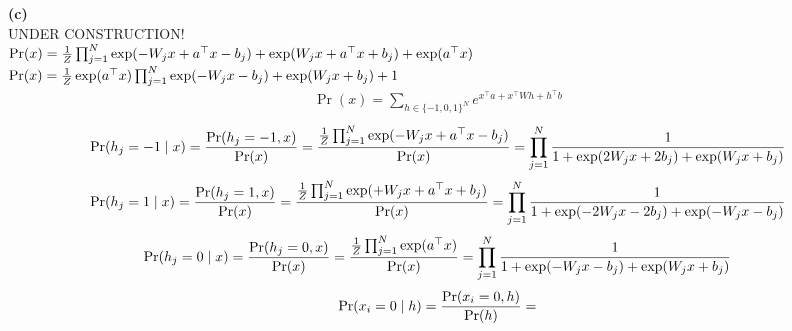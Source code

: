 \documentclass[a4paper]{article}
\newcommand{\hto}{{h^\top}}
\newcommand{\xt}{{x^\top}}
\newcommand{\1}{\mathds{1}}
\begin{document}
\newpage
\textbf{(c)} \\
UNDER CONSTRUCTION!
\\
$\Pr(x) = {1 \over Z}\prod_{j=1}^N \exp(-W_jx+a^\top x - b_j) + \exp(W_jx + a^\top x + b_j) + \exp(a^\top x)$
\\
$\Pr(x) = {1 \over Z}\exp(a^\top x)\prod_{j=1}^N \exp(-W_jx - b_j) + \exp(W_jx + b_j) + 1$
\begin{gather*}
	\Pr(x) = \sum_{h\in\{-1,0,1\}^N} e^{\xt a + \xt Wh + \hto b }
\end{gather*}
\begin{gather*}
	\Pr(h_j = -1 \mid x) = {\Pr(h_j = -1, x)\over \Pr(x)} 
	= 
	{{1 \over Z}\prod_{j=1}^N \exp(-W_jx+a^\top x - b_j) \over \Pr(x)}
	=
	\prod_{j=1}^N \frac{1}{1 + \exp(2W_jx + 2b_j) + \exp(W_jx + b_j)} 
\end{gather*}
\begin{gather*}
	\Pr(h_j = 1 \mid x) = {\Pr(h_j = 1, x)\over \Pr(x)} 
	= 
	{{1 \over Z}\prod_{j=1}^N \exp(+W_jx+a^\top x + b_j) \over \Pr(x)}
	=
	\prod_{j=1}^N \frac{1}{1 + \exp(-2W_jx - 2b_j) + \exp(-W_jx - b_j)} 
\end{gather*}
\begin{gather*}
	\Pr(h_j = 0 \mid x) = {\Pr(h_j = 0, x)\over \Pr(x)} 
	= 
	{{1 \over Z}\prod_{j=1}^N \exp(a^\top x) \over \Pr(x)}
	=
	\prod_{j=1}^N \frac{1}{1 + \exp(-W_jx - b_j) + \exp(W_jx + b_j)} 
\end{gather*}
\begin{gather*}
	\Pr(x_i = 0 \mid h) = {\Pr(x_i = 0, h)\over \Pr(h)} =  
\end{gather*}
\end{document}
